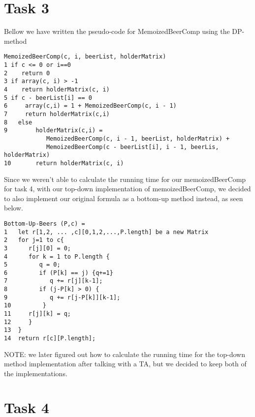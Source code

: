 \documentclass[12pt]{article}
\begin{document}
\section{Task 3}
Bellow we have written the pseudo-code for MemoizedBeerComp using the DP-method\\
\begin{verbatim}
MemoizedBeerComp(c, i, beerList, holderMatrix)
1 if c <= 0 or i==0
2    return 0
3 if array(c, i) > -1
4    return holderMatrix(c, i)
5 if c - beerList[i] == 0
6     array(c,i) = 1 + MemoizedBeerComp(c, i - 1)
7     return holderMatrix(c,i)
8   else
9        holderMatrix(c,i) =
            MemoizedBeerComp(c, i - 1, beerList, holderMatrix) +
            MemoizedBeerComp(c - beerList[i], i - 1, beerLis, holderMatrix)
10       return holderMatrix(c, i)
\end{verbatim}
Since we weren't able to calculate the running time for our memoizedBeerComp for task 4, with our top-down implementation of memoizedBeerComp, we decided to also implement our original formula as a bottom-up method instead, as seen below.
\begin{verbatim}
Bottom-Up-Beers (P,c) = 
1   let r[1,2, ... ,c][0,1,2,...,P.length] be a new Matrix
2   for j=1 to c{
3      r[j][0] = 0;
4      for k = 1 to P.length {
5         q = 0;
6         if (P[k] == j) {q+=1}
7            q += r[j][k-1];
8         if (j-P[k] > 0) {
9            q += r[j-P[k]][k-1];
10         }
11     r[j][k] = q;	
12     }
13  }
14	return r[c][P.length];
\end{verbatim}
NOTE: we later figured out how to calculate the running time for the top-down method implementation after talking with a TA, but we decided to keep both of the implementations.
\section{Task 4}




\end{document}
